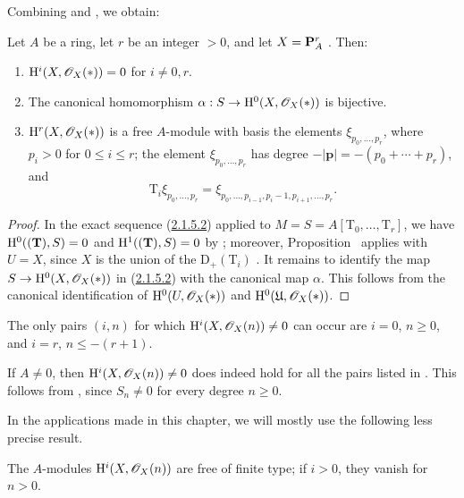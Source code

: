 Combining  and , we obtain:

\begin{proposition}[2.1.12]
\label{III.2.1.12}
Let $A$ be a ring, let $r$ be an integer $>0$, and let $X=\mathbf{P}_A^r$ .
Then:
\begin{enumerate}
  \item[{\rm(i)}] $\mathrm{H}^i(X,\mathscr{O}_X(*))=0$ for $i\neq0,r$.
  \item[{\rm(ii)}] The canonical homomorphism $\alpha:S\to\mathrm{H}^0(X,\mathscr{O}_X(*))$  is bijective.
  \item[{\rm(iii)}] $\mathrm{H}^r(X,\mathscr{O}_X(*))$ is a free $A$-module with basis the elements $\xi_{p_0,\dots,p_r}$, where $p_i>0$ for $0\leq i\leq r$; the element $\xi_{p_0,\dots,p_r}$ has degree $-|\mathbf{p}|=-(p_0+\cdots+p_r)$, and
  \[
    \mathrm{T}_i\xi_{p_0,\dots,p_r}
    =\xi_{p_0,\dots,p_{i-1},p_i-1,p_{i+1},\dots,p_r}.
  \]
\end{enumerate}
\end{proposition}

\begin{proof}
In the exact sequence (\hyperref[III.2.1.5.2]{2.1.5.2}) applied to $M=S=A[\mathrm{T}_0,\dots,\mathrm{T}_r]$, we have $\mathrm{H}^0((\mathbf{T}),S)=0$ and $\mathrm{H}^1((\mathbf{T}),S)=0$ by ; moreover, Proposition~ applies with $U=X$, since $X$ is the union of the $\mathrm{D}_+(\mathrm{T}_i)$ .
It remains to identify the map $S\to\mathrm{H}^0(X,\mathscr{O}_X(*))$ in (\hyperref[III.2.1.5.2]{2.1.5.2}) with the canonical map $\alpha$.
This follows from the canonical identification of $\mathrm{H}^0(U,\mathscr{O}_X(*))$ and $\mathrm{H}^0(\mathfrak{U},\mathscr{O}_X(*))$.
\end{proof}

\begin{corollary}[2.1.13]
\label{III.2.1.13}
The only pairs $(i,n)$ for which $\mathrm{H}^i(X,\mathscr{O}_X(n))\neq0$ can occur are $i=0$, $n\geq0$, and $i=r$, $n\leq-(r+1)$.
\end{corollary}

If $A\neq0$, then $\mathrm{H}^i(X,\mathscr{O}_X(n))\neq0$ does indeed hold for all the pairs listed in .
This follows from , since $S_n\neq0$ for every degree $n\geq0$.

In the applications made in this chapter, we will mostly use the following less precise result.

\begin{corollary}[2.1.14]
\label{III.2.1.14}
The $A$-modules $\mathrm{H}^i(X,\mathscr{O}_X(n))$ are free of finite type; if $i>0$, they vanish for $n>0$.
\end{corollary}

